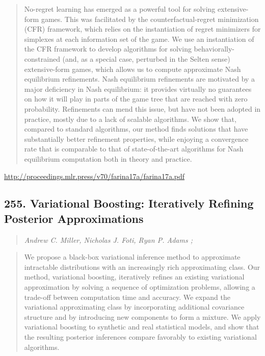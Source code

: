 \documentclass{article}
\begin{document}
\begin{quote}
    No-regret learning has emerged as a powerful tool for solving extensive-form games. This was facilitated by the counterfactual-regret minimization (CFR) framework, which relies on the instantiation of regret minimizers for simplexes at each information set of the game. We use an instantiation of the CFR framework to develop algorithms for solving behaviorally-constrained (and, as a special case, perturbed in the Selten sense) extensive-form games, which allows us to compute approximate Nash equilibrium refinements. Nash equilibrium refinements are motivated by a major deficiency in Nash equilibrium: it provides virtually no guarantees on how it will play in parts of the game tree that are reached with zero probability. Refinements can mend this issue, but have not been adopted in practice, mostly due to a lack of scalable algorithms. We show that, compared to standard algorithms, our method finds solutions that have substantially better refinement properties, while enjoying a convergence rate that is comparable to that of state-of-the-art algorithms for Nash equilibrium computation both in theory and practice.  
\end{quote}

\href{http://proceedings.mlr.press/v70/farina17a/farina17a.pdf}{http://proceedings.mlr.press/v70/farina17a/farina17a.pdf}

\subsection{255. Variational Boosting: Iteratively Refining Posterior Approximations}

\begin{quote}
\footnotesize{\textit{Andrew C. Miller, Nicholas J. Foti, Ryan P. Adams ;}}

\end{quote}

\begin{quote}
    We propose a black-box variational inference method to approximate intractable distributions with an increasingly rich approximating class. Our method, variational boosting, iteratively refines an existing variational approximation by solving a sequence of optimization problems, allowing a trade-off between computation time and accuracy. We expand the variational approximating class by incorporating additional covariance structure and by introducing new components to form a mixture. We apply variational boosting to synthetic and real statistical models, and show that the resulting posterior inferences compare favorably to existing variational algorithms.  
\end{quote}
\end{document}
